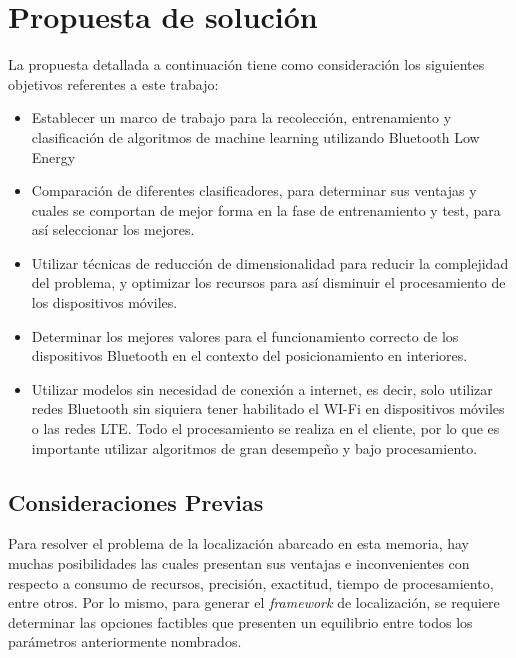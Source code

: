 \chapter{Propuesta de solución}

La propuesta detallada a continuación tiene como consideración los siguientes objetivos referentes a este trabajo:

\begin{itemize}
\item Establecer un marco de trabajo para la recolección, entrenamiento y clasificación de algoritmos de machine learning utilizando Bluetooth Low Energy

\item Comparación de diferentes clasificadores, para determinar sus ventajas y cuales se comportan de mejor forma en la fase de entrenamiento y test, para así seleccionar los mejores.

\item Utilizar técnicas de reducción de dimensionalidad para reducir la complejidad del problema, y optimizar los recursos para así disminuir el procesamiento de los dispositivos móviles.

\item Determinar los mejores valores para el funcionamiento correcto de los dispositivos Bluetooth en el contexto del posicionamiento en interiores.

\item Utilizar modelos sin necesidad de conexión a internet, es decir, solo utilizar redes Bluetooth sin siquiera tener habilitado el WI-Fi en dispositivos móviles o las redes LTE. Todo el procesamiento se realiza en el cliente, por lo que es importante utilizar algoritmos de gran desempeño y bajo procesamiento.
\end{itemize}


\section{Consideraciones Previas}

Para resolver el problema de la localización abarcado en esta memoria, hay muchas posibilidades las cuales presentan sus ventajas e inconvenientes con respecto a consumo de recursos, precisión, exactitud, tiempo de procesamiento, entre otros. Por lo mismo, para generar el \textit{framework} de localización, se requiere determinar las opciones factibles que presenten un equilibrio entre todos los parámetros anteriormente nombrados.

